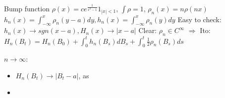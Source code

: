 \documentclass{article}
\begin{document}
Bump function $\rho(x) = c e^{\frac1{x^2-1}}1_{|x| < 1}$, $\int \rho = 1$, $\rho_n(x) = n\rho(nx)$
$h_n(x) = \int_{-\infty}^x \rho_n(y - a)dy, h_n(x) = \int_{-\infty}^x \rho_n(y)dy$
Easy to check: $h_n(x) \rightarrow sgn(x-a), H_n(x) \rightarrow |x - a|$
Clear: $\rho_n \in C^{\infty}$
$\Rightarrow$ Ito:  $H_n(B_t) = H_n(B_0) + \int_0^t h_n(B_s)dB_s + \int_0^t \frac12 \rho_n(B_s)ds$

$n \rightarrow \infty$:
\begin{itemize}
\item $H_n(B_t) \rightarrow |B_t - a|$, as
\item 
\end{itemize}
\end{document}
